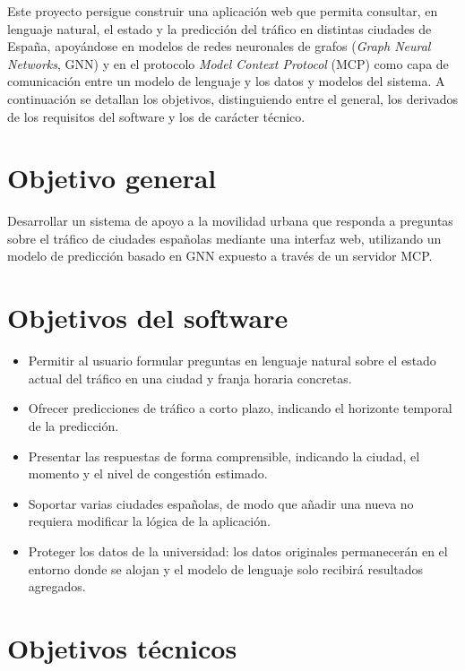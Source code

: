 
Este proyecto persigue construir una aplicación web que permita consultar, en lenguaje natural, el estado y la predicción del tráfico en distintas ciudades de España, apoyándose en modelos de redes neuronales de grafos (\textit{Graph Neural Networks}, GNN) y en el protocolo \textit{Model Context Protocol} (MCP) como capa de comunicación entre un modelo de lenguaje y los datos y modelos del sistema. A continuación se detallan los objetivos, distinguiendo entre el general, los derivados de los requisitos del software y los de carácter técnico.

\section{Objetivo general}

Desarrollar un sistema de apoyo a la movilidad urbana que responda a preguntas sobre el tráfico de ciudades españolas mediante una interfaz web, utilizando un modelo de predicción basado en GNN expuesto a través de un servidor MCP.

\section{Objetivos del software}

\begin{itemize}
  \item Permitir al usuario formular preguntas en lenguaje natural sobre el estado actual del tráfico en una ciudad y franja horaria concretas.
  \item Ofrecer predicciones de tráfico a corto plazo, indicando el horizonte temporal de la predicción.
  \item Presentar las respuestas de forma comprensible, indicando la ciudad, el momento y el nivel de congestión estimado.
  \item Soportar varias ciudades españolas, de modo que añadir una nueva no requiera modificar la lógica de la aplicación.
  \item Proteger los datos de la universidad: los datos originales permanecerán en el entorno donde se alojan y el modelo de lenguaje solo recibirá resultados agregados.
\end{itemize}

\section{Objetivos técnicos}

